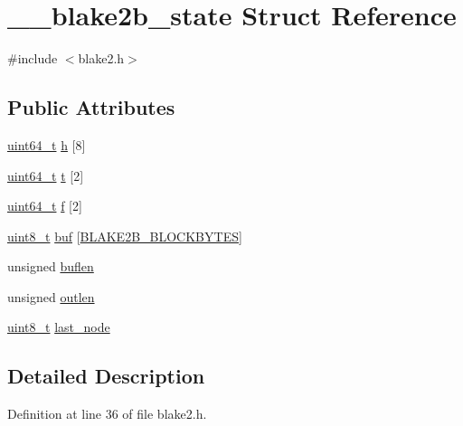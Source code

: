 \hypertarget{struct____blake2b__state}{}\section{\+\_\+\+\_\+blake2b\+\_\+state Struct Reference}
\label{struct____blake2b__state}


{\ttfamily \#include $<$blake2.\+h$>$}

\subsection*{Public Attributes}
\begin{DoxyCompactItemize}
\item 
\hyperlink{stdint_8h_aaa5d1cd013383c889537491c3cfd9aad}{uint64\+\_\+t} \hyperlink{struct____blake2b__state_a98f8e01951c0944e82dff97c9a5ae700}{h} \mbox{[}8\mbox{]}
\item 
\hyperlink{stdint_8h_aaa5d1cd013383c889537491c3cfd9aad}{uint64\+\_\+t} \hyperlink{struct____blake2b__state_a5a249e17d3c4ffc78b512430a8f053b2}{t} \mbox{[}2\mbox{]}
\item 
\hyperlink{stdint_8h_aaa5d1cd013383c889537491c3cfd9aad}{uint64\+\_\+t} \hyperlink{struct____blake2b__state_a611101aaef0e6a2916d83266696ddf45}{f} \mbox{[}2\mbox{]}
\item 
\hyperlink{stdint_8h_aba7bc1797add20fe3efdf37ced1182c5}{uint8\+\_\+t} \hyperlink{struct____blake2b__state_ab56d8559f6de9a905c64df6214113e94}{buf} \mbox{[}\hyperlink{blake2_8h_a55df020abc59e40eb12965cf08eca1b5aea9f79a4ec90a788ea0590ae5dfda693}{B\+L\+A\+K\+E2\+B\+\_\+\+B\+L\+O\+C\+K\+B\+Y\+T\+E\+S}\mbox{]}
\item 
unsigned \hyperlink{struct____blake2b__state_a613f0decce59102cabda809ef7ff7f3b}{buflen}
\item 
unsigned \hyperlink{struct____blake2b__state_aa5803608622e985dd48d6b36f8761a57}{outlen}
\item 
\hyperlink{stdint_8h_aba7bc1797add20fe3efdf37ced1182c5}{uint8\+\_\+t} \hyperlink{struct____blake2b__state_a0b50544072b2bf05c743bdb65c1015cd}{last\+\_\+node}
\end{DoxyCompactItemize}


\subsection{Detailed Description}


Definition at line 36 of file blake2.\+h.



